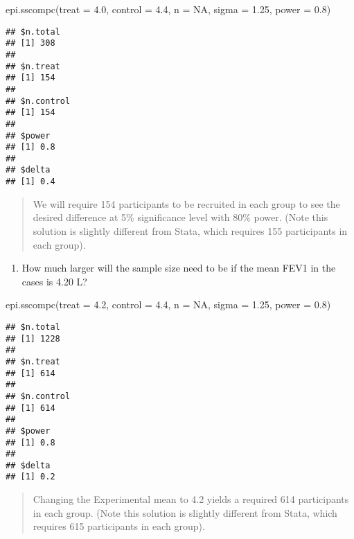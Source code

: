\documentclass[
]{memoir}
\newenvironment{Shaded}{\begin{snugshade}}{\end{snugshade}}
\newcommand{\AttributeTok}[1]{\textcolor[rgb]{0.77,0.63,0.00}{#1}}
\newcommand{\ConstantTok}[1]{\textcolor[rgb]{0.00,0.00,0.00}{#1}}
\newcommand{\FloatTok}[1]{\textcolor[rgb]{0.00,0.00,0.81}{#1}}
\newcommand{\FunctionTok}[1]{\textcolor[rgb]{0.00,0.00,0.00}{#1}}
\newcommand{\NormalTok}[1]{#1}
\providecommand{\tightlist}{%
  \setlength{\itemsep}{0pt}\setlength{\parskip}{0pt}}
\begin{document}
\begin{Shaded}
\begin{Highlighting}[]
\FunctionTok{epi.sscompc}\NormalTok{(}\AttributeTok{treat =} \FloatTok{4.0}\NormalTok{, }\AttributeTok{control =} \FloatTok{4.4}\NormalTok{, }\AttributeTok{n =} \ConstantTok{NA}\NormalTok{, }\AttributeTok{sigma =} \FloatTok{1.25}\NormalTok{, }\AttributeTok{power =} \FloatTok{0.8}\NormalTok{)}
\end{Highlighting}
\end{Shaded}

\begin{verbatim}
## $n.total
## [1] 308
## 
## $n.treat
## [1] 154
## 
## $n.control
## [1] 154
## 
## $power
## [1] 0.8
## 
## $delta
## [1] 0.4
\end{verbatim}

\begin{quote}
We will require 154 participants to be recruited in each group to see the desired difference at 5\% significance level with 80\% power. (Note this solution is slightly different from Stata, which requires 155 participants in each group).
\end{quote}

\begin{enumerate}
\def\labelenumi{\alph{enumi})}
\setcounter{enumi}{2}
\tightlist
\item
  How much larger will the sample size need to be if the mean FEV1 in the cases is 4.20 L?
\end{enumerate}

\begin{Shaded}
\begin{Highlighting}[]
\FunctionTok{epi.sscompc}\NormalTok{(}\AttributeTok{treat =} \FloatTok{4.2}\NormalTok{, }\AttributeTok{control =} \FloatTok{4.4}\NormalTok{, }\AttributeTok{n =} \ConstantTok{NA}\NormalTok{, }\AttributeTok{sigma =} \FloatTok{1.25}\NormalTok{, }\AttributeTok{power =} \FloatTok{0.8}\NormalTok{)}
\end{Highlighting}
\end{Shaded}

\begin{verbatim}
## $n.total
## [1] 1228
## 
## $n.treat
## [1] 614
## 
## $n.control
## [1] 614
## 
## $power
## [1] 0.8
## 
## $delta
## [1] 0.2
\end{verbatim}

\begin{quote}
Changing the Experimental mean to 4.2 yields a required 614 participants in each group. (Note this solution is slightly different from Stata, which requires 615 participants in each group).
\end{quote}
\end{document}
